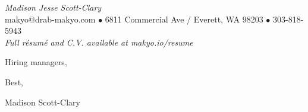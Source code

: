 \documentclass[letterpaper]{memoir}
\begin{document}
\begin{center}
  {\huge \textit{\color{titlegreydark} Madison Jesse Scott-Clary}}\\
  {\color{titlegreydark} makyo@drab-makyo.com $\bullet$ 6811 Commercial Ave / Everett, WA 98203 $\bullet$ 303-818-5943}\\
  {\small \color{titlegreylight} \textit{Full r\'esum\'e and C.V. available at makyo.io/resume}}
\end{center}

\vspace{0.5in}

Hiring managers,

\vspace{0.5in}

\noindent 

\vspace{0.5in}

Best,

\vspace{0.25in}

Madison Scott-Clary
\end{document}
